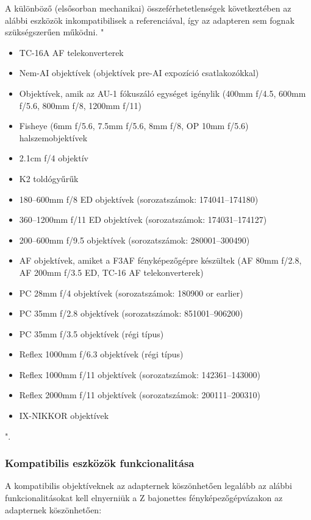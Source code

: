 A különböző (elsősorban mechanikai) összeférhetetlenségek következtében az alábbi eszközök inkompatibilisek a referenciával, így az adapteren sem fognak szükségszerűen működni.
"
\begin{itemize}
	\item TC-16A AF telekonverterek
	\item Nem-AI objektívek (objektívek pre-AI expozíció csatlakozókkal)
	\item Objektívek, amik az AU-1 fókuszáló egységet igénylik (400mm f/4.5, 600mm f/5.6, 800mm f/8, 1200mm f/11)
    \item Fisheye (6mm f/5.6, 7.5mm f/5.6, 8mm f/8, OP 10mm f/5.6) halszemobjektívek
    \item 2.1cm f/4 objektív
    \item K2 toldógyűrűk
    \item 180–600mm f/8 ED objektívek (sorozatszámok: 174041–174180)
    \item 360–1200mm f/11 ED objektívek (sorozatszámok: 174031–174127)
    \item 200–600mm f/9.5 objektívek (sorozatszámok: 280001–300490)
    \item AF objektívek, amiket a F3AF fényképezőgépre készültek (AF 80mm f/2.8, AF 200mm f/3.5 ED, TC-16 AF telekonverterek)
    \item PC 28mm f/4 objektívek (sorozatszámok: 180900 or earlier)
    \item PC 35mm f/2.8 objektívek (sorozatszámok: 851001–906200)
    \item PC 35mm f/3.5 objektívek (régi típus)
    \item Reflex 1000mm f/6.3 objektívek (régi típus)
    \item Reflex 1000mm f/11 objektívek (sorozatszámok: 142361–143000)
    \item Reflex 2000mm f/11 objektívek (sorozatszámok: 200111–200310)
    \item IX-NIKKOR objektívek
\end{itemize}
"\cite{Nikon_D6_referencia_használati_utasítás}. 

\subsubsection{Kompatibilis eszközök funkcionalitása}

A kompatibilis objektíveknek az adapternek köszönhetően legalább az alábbi funkcionalitásokat kell elnyerniük a Z bajonettes fényképezőgépvázakon az adapternek köszönhetően:


